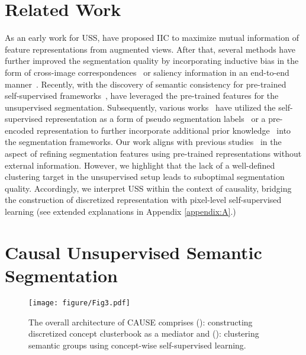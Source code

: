 \documentclass{article} \usepackage{iclr2024_conference,times}
\begin{document}
\section{Related Work}
\label{sec:2}
As an early work for USS, \citet{ji2019invariant} have proposed IIC to maximize mutual information of feature representations from augmented views. After that, several methods have further improved the segmentation quality by incorporating inductive bias in the form of cross-image correspondences~\citep{hwang2019segsort,cho2021picie,wen2022selfsupervised} or saliency information in an end-to-end manner~\citep{van2021unsupervised, ke2022unsupervised}. Recently, with the discovery of semantic consistency for pre-trained self-supervised frameworks~\citep{caron2021emerging}, \citet{hamilton2022unsupervised} have leveraged the pre-trained features for the unsupervised segmentation. Subsequently, various works~\citep{wen2022selfsupervised, yin2022transfgu, ziegler2022self} have utilized the self-supervised representation as a form of pseudo segmentation labels~\citep{zadaianchuk2023unsupervised, liacseg} or a pre-encoded representation to further incorporate additional prior knowledge~\citep{van2021unsupervised, zadaianchuk2023unsupervised} into the segmentation frameworks. Our work aligns with previous studies~\citep{hamilton2022unsupervised, seong2023leveraging} in the aspect of refining segmentation features using pre-trained representations without external information. However, we highlight that the lack of a well-defined clustering target in the unsupervised setup leads to suboptimal segmentation quality. Accordingly, we interpret USS within the context of causality, bridging the construction of discretized representation with pixel-level self-supervised learning (see extended explanations in Appendix \ref{appendix:A}.)

\section{Causal Unsupervised Semantic Segmentation}
\label{sec:3}

\begin{figure*}[t]
\vspace{-13mm}
\centering
\texttt{[image: figure/Fig3.pdf]}
\vspace*{-3mm}
\caption{The overall architecture of CAUSE comprises (\lowercase\expandafter{}): constructing discretized concept clusterbook as a mediator and (\lowercase\expandafter{}): clustering semantic groups using concept-wise self-supervised learning.}
\vspace{-5mm}
\label{fig:3}
\end{figure*}
\end{document}
